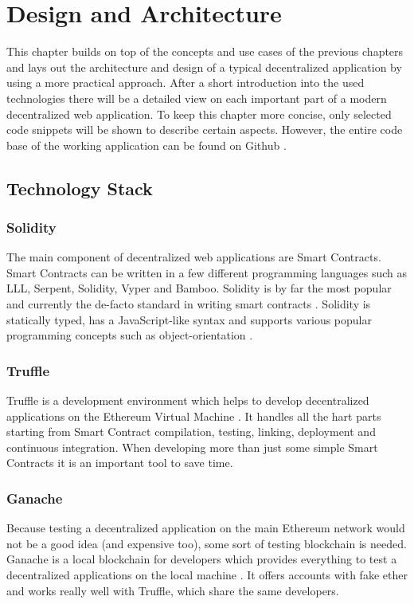 \chapter{Design and Architecture}
\label{cha:DesignArchitecture}

This chapter builds on top of the concepts and use cases of the previous chapters and lays out the architecture and design of a typical decentralized application by using a more practical approach. After a short introduction into the used technologies there will be a detailed view on each important part of a modern decentralized web application. To keep this chapter more concise, only selected code snippets will be shown to describe certain aspects. However, the entire code base of the working application can be found on Github \cite{CherryPool}.

\section{Technology Stack}
\subsection{Solidity}
The main component of decentralized web applications are Smart Contracts. Smart Contracts can be written in a few different programming languages such as LLL, Serpent, Solidity, Vyper and Bamboo. Solidity is by far the most popular and currently the de-facto standard in writing smart contracts \cite{AntonopoulosWood2018}. Solidity is statically typed, has a JavaScript-like syntax and supports various popular programming concepts such as object-orientation \cite{SolidityDocumentation}\cite{Solidity}.

\subsection{Truffle}
Truffle is a development environment which helps to develop decentralized applications on the Ethereum Virtual Machine \cite{Truffle}. It handles all the hart parts starting from Smart Contract compilation, testing, linking, deployment and continuous integration. When developing more than just some simple Smart Contracts it is an important tool to save time.

\subsection{Ganache}
Because testing a decentralized application on the main Ethereum network would not be a good idea (and expensive too), some sort of testing blockchain is needed. Ganache is a local blockchain for developers which provides everything to test a decentralized applications on the local machine \cite{Ganache}. It offers accounts with fake ether and works really well with Truffle, which share the same developers.

